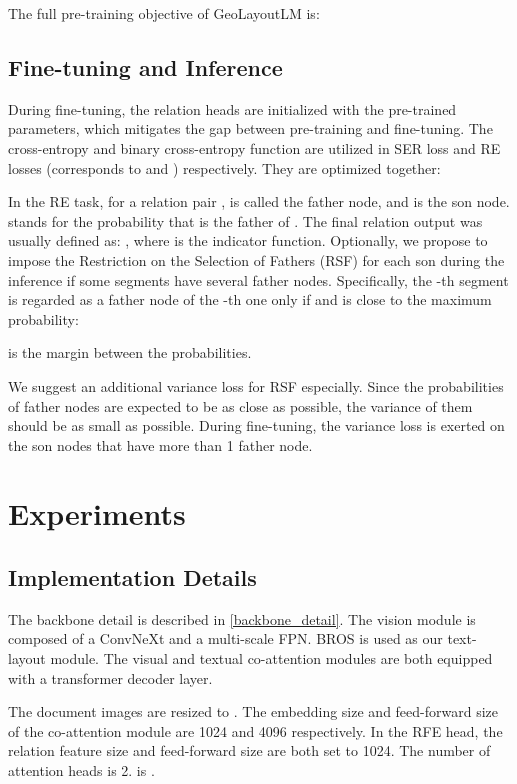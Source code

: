 \documentclass[10pt,twocolumn,letterpaper]{article}
\begin{document}
The full pre-training objective of GeoLayoutLM is:


\subsection{Fine-tuning and Inference}
During fine-tuning, the relation heads are initialized with the pre-trained parameters, which mitigates the gap between pre-training and fine-tuning.
The cross-entropy and binary cross-entropy function are utilized in SER loss  and RE losses  (corresponds to  and ) respectively.
They are optimized together:
\vspace{-2mm}


In the RE task, for a relation pair ,  is called the father node, and  is the son node.
 stands for the probability that  is the father of .
The final relation output  was usually defined as: , where  is the indicator function.
Optionally, we propose to impose the Restriction on the Selection of Fathers (RSF) for each son during the inference if some segments have several father nodes.
Specifically, the -th segment is regarded as a father node of the -th one only if  and  is close to the maximum probability:






  is the margin between the probabilities.



We suggest an additional variance loss for RSF especially. Since the probabilities of father nodes are expected to be as close as possible, the variance of them should be as small as possible. During fine-tuning, the variance loss is exerted on the son nodes that have more than 1 father node.


\section{Experiments}
\subsection{Implementation Details}
The backbone detail is described in \cref{backbone_detail}. 
The vision module is composed of a ConvNeXt\cite{liu2022convnet} and a multi-scale FPN\cite{liao2020real}. BROS\cite{hong2022bros} is used as our text-layout module. The visual and textual co-attention modules are both equipped with a transformer decoder layer.

The document images are resized to . The embedding size and feed-forward size of the co-attention module are 1024 and 4096 respectively.
In the RFE head, the relation feature size and feed-forward size are both set to 1024. The number of attention heads is 2.  is .
\end{document}
